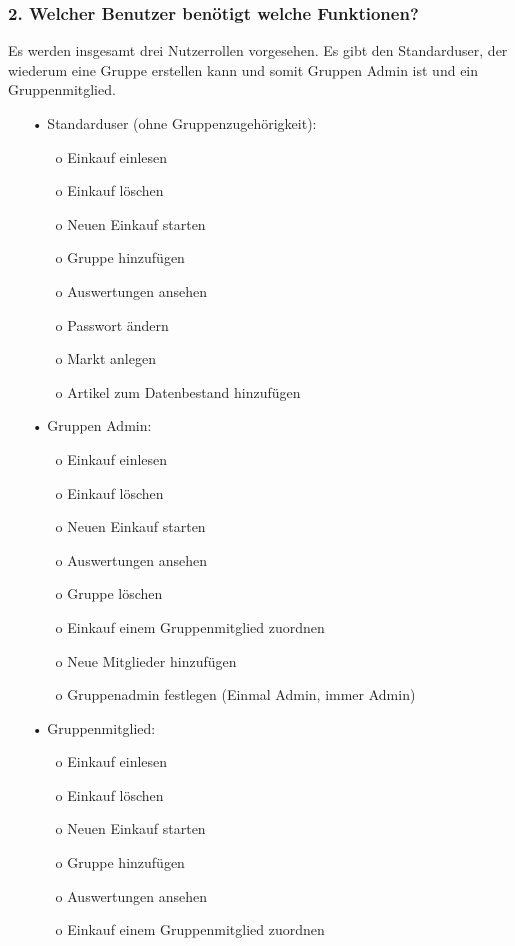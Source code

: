 \documentclass[12pt,a4paper]{article}
\begin{document}
\subsubsection*{2. Welcher Benutzer benötigt welche Funktionen?}
Es werden insgesamt drei Nutzerrollen vorgesehen. Es gibt den Standarduser, der wiederum eine Gruppe erstellen kann und somit Gruppen Admin ist und ein Gruppenmitglied.
\begin{itemize}
\item[•]Standarduser (ohne Gruppenzugehörigkeit):
\begin{itemize}
\item[o] Einkauf einlesen
\item[o] Einkauf löschen
\item[o] Neuen Einkauf starten
\item[o] Gruppe hinzufügen
\item[o] Auswertungen ansehen
\item[o] Passwort ändern
\item[o] Markt anlegen
\item[o] Artikel zum Datenbestand hinzufügen
\end{itemize}       
\end{itemize} 

\begin{itemize}
\item[•]Gruppen Admin:
\begin{itemize}
\item[o] Einkauf einlesen
\item[o] Einkauf löschen
\item[o] Neuen Einkauf starten
\item[o] Auswertungen ansehen
\item[o] Gruppe löschen
\item[o] Einkauf einem Gruppenmitglied zuordnen
\item[o] Neue Mitglieder hinzufügen
\item[o] Gruppenadmin festlegen (Einmal Admin, immer Admin)
\end{itemize}
\end{itemize}

\begin{itemize}
\item[•] Gruppenmitglied:
\begin{itemize}
\item[o] Einkauf einlesen
\item[o] Einkauf löschen
\item[o] Neuen Einkauf starten
\item[o] Gruppe hinzufügen
\item[o] Auswertungen ansehen
\item[o] Einkauf einem Gruppenmitglied zuordnen
\end{itemize}
\end{itemize}
\end{document}
